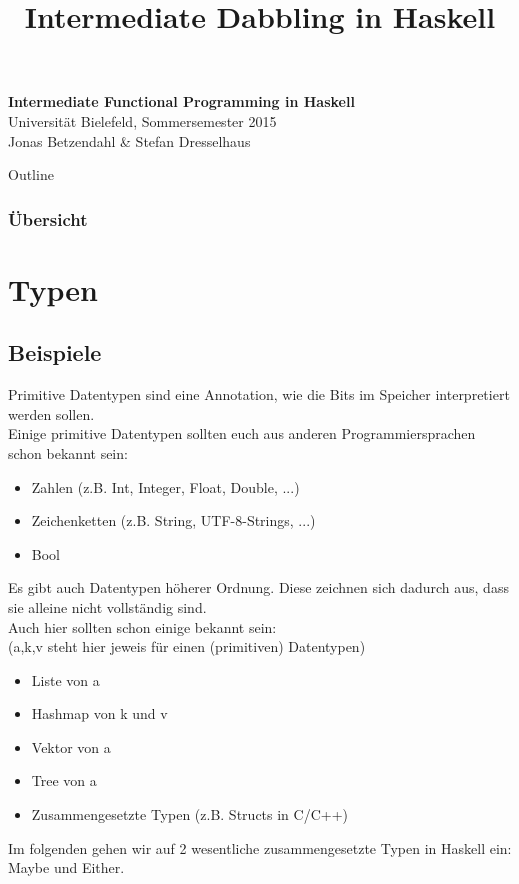 \documentclass{beamer}
\title{Intermediate Dabbling in Haskell}
\begin{document}
  

  \begin{frame}
  \begin{center}
    \Huge\textbf{Intermediate Functional Programming in Haskell}\\ \bigskip
    \LARGE Universität Bielefeld, Sommersemester 2015\\ \bigskip
    \large Jonas Betzendahl \& Stefan Dresselhaus
    \end{center}
  \end{frame}

\begin{frame}[allowframebreaks]{Outline}
\frametitle{Übersicht}
\tableofcontents[hideallsubsections]
\end{frame}

\section{Typen}
\subsection{Beispiele}
\begin{frame}
 Primitive Datentypen sind eine Annotation, wie die Bits im Speicher interpretiert werden sollen.\\
 \pause
 Einige primitive Datentypen sollten euch aus anderen Programmiersprachen schon bekannt sein:
 \begin{itemize}
  \item Zahlen (z.B. Int, Integer, Float, Double, ...)
  \item Zeichenketten (z.B. String, UTF-8-Strings, ...)
  \item Bool
 \end{itemize}
\end{frame}

\begin{frame}
 Es gibt auch Datentypen höherer Ordnung. Diese zeichnen sich dadurch aus, dass sie alleine nicht vollständig sind.\\
 \pause
 Auch hier sollten schon einige bekannt sein:\\
 (a,k,v steht hier jeweis für einen (primitiven) Datentypen)
 \begin{itemize}
  \item Liste von a
  \item Hashmap von k und v
  \item Vektor von a
  \item Tree von a
  \item Zusammengesetzte Typen (z.B. Structs in C/C++)
 \end{itemize}
 \pause
 Im folgenden gehen wir auf 2 wesentliche zusammengesetzte Typen in Haskell ein: Maybe und Either.
\end{frame}
\end{document}
